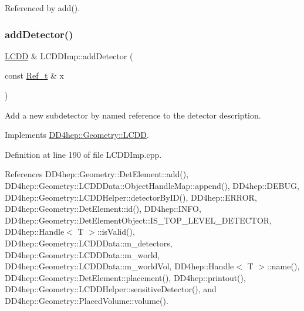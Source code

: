 Referenced by add().

\hypertarget{class_d_d4hep_1_1_geometry_1_1_l_c_d_d_imp_ad0926dfc64d99cddfdec4990829d3622}{}\label{class_d_d4hep_1_1_geometry_1_1_l_c_d_d_imp_ad0926dfc64d99cddfdec4990829d3622} 
\subsubsection{\texorpdfstring{add\+Detector()}{addDetector()}}
{\footnotesize\ttfamily \hyperlink{class_d_d4hep_1_1_geometry_1_1_l_c_d_d}{L\+C\+DD} \& L\+C\+D\+D\+Imp\+::add\+Detector (\begin{DoxyParamCaption}\item[{const \hyperlink{group___d_d4_h_e_p___g_e_o_m_e_t_r_y_ga40af83be6718bb8828a3d83dc7f8c930}{Ref\+\_\+t} \&}]{x }\end{DoxyParamCaption})\hspace{0.3cm}{\ttfamily [virtual]}}



Add a new subdetector by named reference to the detector description. 



Implements \hyperlink{class_d_d4hep_1_1_geometry_1_1_l_c_d_d_a53a88518d0ab797a11bd61f9c567f7ac}{D\+D4hep\+::\+Geometry\+::\+L\+C\+DD}.



Definition at line 190 of file L\+C\+D\+D\+Imp.\+cpp.



References D\+D4hep\+::\+Geometry\+::\+Det\+Element\+::add(), D\+D4hep\+::\+Geometry\+::\+L\+C\+D\+D\+Data\+::\+Object\+Handle\+Map\+::append(), D\+D4hep\+::\+D\+E\+B\+UG, D\+D4hep\+::\+Geometry\+::\+L\+C\+D\+D\+Helper\+::detector\+By\+I\+D(), D\+D4hep\+::\+E\+R\+R\+OR, D\+D4hep\+::\+Geometry\+::\+Det\+Element\+::id(), D\+D4hep\+::\+I\+N\+FO, D\+D4hep\+::\+Geometry\+::\+Det\+Element\+Object\+::\+I\+S\+\_\+\+T\+O\+P\+\_\+\+L\+E\+V\+E\+L\+\_\+\+D\+E\+T\+E\+C\+T\+OR, D\+D4hep\+::\+Handle$<$ T $>$\+::is\+Valid(), D\+D4hep\+::\+Geometry\+::\+L\+C\+D\+D\+Data\+::m\+\_\+detectors, D\+D4hep\+::\+Geometry\+::\+L\+C\+D\+D\+Data\+::m\+\_\+world, D\+D4hep\+::\+Geometry\+::\+L\+C\+D\+D\+Data\+::m\+\_\+world\+Vol, D\+D4hep\+::\+Handle$<$ T $>$\+::name(), D\+D4hep\+::\+Geometry\+::\+Det\+Element\+::placement(), D\+D4hep\+::printout(), D\+D4hep\+::\+Geometry\+::\+L\+C\+D\+D\+Helper\+::sensitive\+Detector(), and D\+D4hep\+::\+Geometry\+::\+Placed\+Volume\+::volume().



